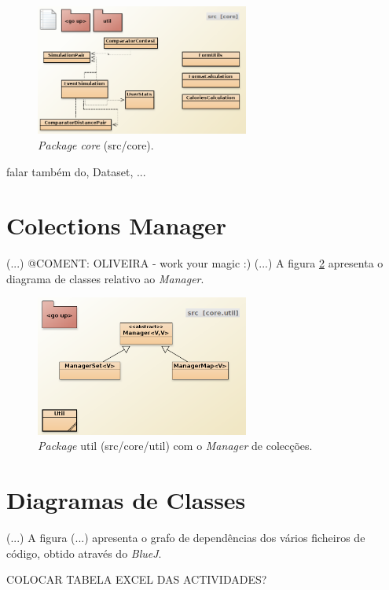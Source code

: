 \documentclass[a4paper,10pt]{report}
\begin{document}
\begin{figure}
\centering
\includegraphics[width=7cm]{core.png}
\caption{\emph{Package core} (src/core).}
\label{fig:core}
\end{figure}



falar também do, Dataset, ...

\section{Colections Manager}
\label{sec:manager}
(...)
@COMENT: OLIVEIRA - work your magic :)
(...)
A figura \ref{fig:manager} apresenta o diagrama de classes relativo ao \emph{Manager}.

\begin{figure}
\centering
\includegraphics[width=7cm]{coreUtil.png}
\caption{\emph{Package} util (src/core/util) com o \emph{Manager} de colecções.}
\label{fig:manager}
\end{figure}

\section{Diagramas de Classes}
\label{sec:classes}
(...)
A figura (...) apresenta o grafo de dependências dos vários ficheiros de código, obtido através do \emph{BlueJ}.

COLOCAR TABELA EXCEL DAS ACTIVIDADES?
\end{document}
